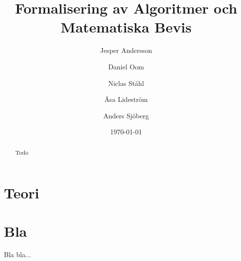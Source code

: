 \documentclass[a4paper]{article}
\title{Formalisering av Algoritmer och Matematiska Bevis}
\author[1]{Jesper Andersson}
\author[1]{Daniel Oom}
\author[1]{Niclas Ståhl}
\author[2]{Åsa Lideström}
\author[2]{Anders Sjöberg}
\affil[1]{Datateknik, Chalmers}
\affil[2]{Mattematik, Göteborgs Universitet}
\date{\today}
\begin{document}
\begin{abstract}
Todo
\end{abstract}

\maketitle
\thispagestyle{empty}
\newpage
\tableofcontents
\newpage


\section{Teori}





\printbibliography

\appendix
\section{Bla}
Bla bla...
\end{document}
